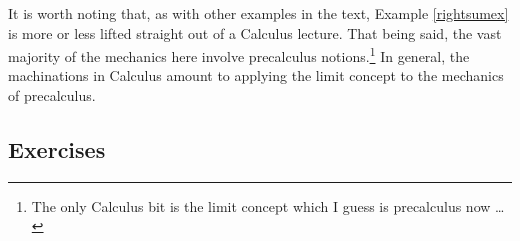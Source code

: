 It is worth noting that, as with other examples in the text,  Example \ref{rightsumex} is more or less lifted straight out of  a Calculus lecture.  That being said, the vast majority of the mechanics here involve precalculus notions.\footnote{The only Calculus bit is the limit concept which I guess is precalculus now \ldots}   In general, the machinations in Calculus amount to applying the limit concept to the mechanics of precalculus.  

\newpage

\subsection{Exercises}




\closegraphsfile
